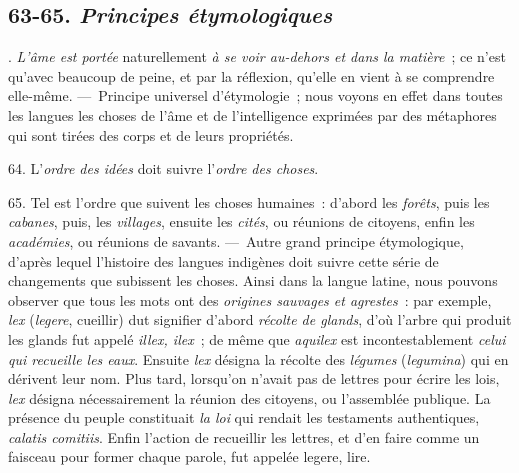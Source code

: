 \documentclass[french,twoside]{book} %
\begin{document}
\subsection[{63-65. Principes étymologiques}]{ \textsc{63-65. } {\itshape Principes étymologiques} }
. {\itshape L’âme est portée} naturellement {\itshape à se voir au-dehors et dans la matière} ; ce n’est qu’avec beaucoup de peine, et par la réflexion, qu’elle en vient à se comprendre elle-même. — Principe universel d’étymologie ; nous voyons en effet dans toutes les langues les choses de l’âme et de l’intelligence exprimées par des métaphores qui sont tirées des corps et de leurs propriétés.\par
\par
 64. L’{\itshape ordre des idées} doit suivre l’{\itshape ordre des choses}.\par
65. Tel est l’ordre que suivent les choses humaines : d’abord les {\itshape forêts}, puis les {\itshape cabanes}, puis, les {\itshape villages}, ensuite les {\itshape cités}, ou réunions de citoyens, enfin les {\itshape académies}, ou réunions de savants. — Autre grand principe étymologique, d’après lequel l’histoire des langues indigènes doit suivre cette série de changements que subissent les choses. Ainsi dans la langue latine, nous pouvons observer que tous les mots ont des {\itshape origines sauvages et agrestes} : par exemple, {\itshape lex} ({\itshape legere}, cueillir) dut signifier d’abord {\itshape récolte de glands}, d’où l’arbre qui produit les glands fut appelé {\itshape illex, ilex} ; de même que {\itshape aquilex} est incontestablement {\itshape celui qui recueille les eaux}. Ensuite {\itshape lex} désigna la récolte des {\itshape légumes} ({\itshape legumina}) qui en dérivent leur nom. Plus tard, lorsqu’on n’avait pas de lettres pour écrire les lois, {\itshape lex} désigna nécessairement la réunion des citoyens, ou l’assemblée publique. La présence du peuple constituait {\itshape la loi} qui rendait les testaments authentiques, {\itshape calatis comitiis}. Enfin l’action de recueillir les lettres, et d’en faire comme un faisceau pour former chaque parole, fut appelée legere, lire.
\end{document}
